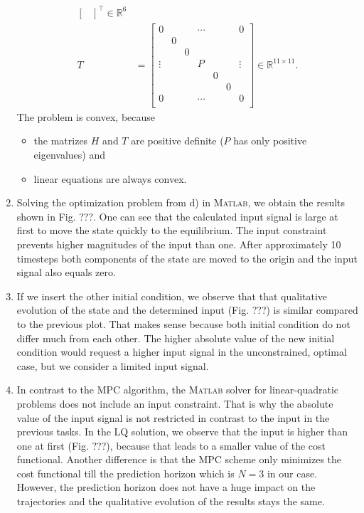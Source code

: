 \documentclass[12pt,pdftex,a4paper]{scrartcl}
\newcommand{\set}[1]{\mathbb{#1}}
\begin{document}
\begin{enumerate}
\begin{align*}
\begin{bmatrix}
		\end{bmatrix}^\top
		\in \set{R}^{6}	\\
		T &=
		\begin{bmatrix}
			0 & & & \cdots & & & 0 \\
			& 0 & & & & & \\
			& & 0 & & & & \\
			\vdots & & & P & & & \vdots \\
			& & & & 0 & & \\
			& & & & & 0 & \\
			0 & & & \cdots & & & 0 \\
		\end{bmatrix}
		\in \set{R}^{11 \times 11}.
	\end{align*}
    The problem is convex, because 
    \begin{itemize}
    \item the matrizes $H$ and $T$ are positive definite ($P$ has only positive eigenvalues) and
    \item linear equations are always convex.
    \end{itemize}        
    
    \item Solving the optimization problem from d) in \textsc{Matlab}, we obtain the results shown in Fig. ???. One can see that the calculated input signal is large at first to move the state quickly to the equilibrium. The input constraint prevents higher magnitudes of the input than one. After approximately 10 timesteps both components of the state are moved to the origin and the input signal also equals zero.
    \item If we insert the other initial condition, we observe that that qualitative evolution of the state and the determined input (Fig. ???) is similar compared to the previous plot. That makes sense because both initial condition do not differ much from each other. The higher absolute value of the new initial condition would request a higher input signal in the unconstrained, optimal case, but we consider a limited input signal.
    \item In contrast to the MPC algorithm, the \textsc{Matlab} solver for linear-quadratic problems does not include an input constraint. That is why the absolute value of the input signal is not restricted in contrast to the input in the previous tasks. In the LQ solution, we observe that the input is higher than one at first (Fig. ???), because that leads to a smaller value of the cost functional. Another difference is that the MPC scheme only minimizes the cost functional till the prediction horizon which is $N=3$ in our case. However, the prediction horizon does not have a huge impact on the trajectories and the qualitative evolution of the results stays the same.
\end{enumerate}


\end{document}
